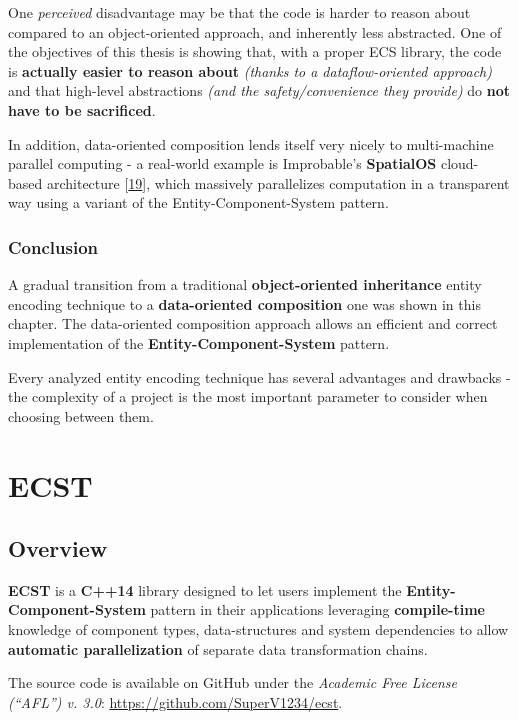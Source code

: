 \documentclass[twoside, 12pt, a4paper, openany]{book}
\begin{document}
One \emph{perceived} disadvantage may be that the code is harder to
reason about compared to an object-oriented approach, and inherently
less abstracted. One of the objectives of this thesis is showing that,
with a proper ECS library, the code is \textbf{actually easier to reason
about} \emph{(thanks to a dataflow-oriented approach)} and that
high-level abstractions \emph{(and the safety/convenience they provide)}
do \textbf{not have to be sacrificed}.

In addition, data-oriented composition lends itself very nicely to
multi-machine parallel computing - a real-world example is Improbable's
\textbf{SpatialOS} cloud-based architecture
{[}\protect\hyperlink{ref-spatialos_learnmore}{19}{]}, which massively
parallelizes computation in a transparent way using a variant of the
Entity-Component-System pattern.

\section{Conclusion}\label{conclusion}

A gradual transition from a traditional \textbf{object-oriented
inheritance} entity encoding technique to a \textbf{data-oriented
composition} one was shown in this chapter. The data-oriented
composition approach allows an efficient and correct implementation of
the \textbf{Entity-Component-System} pattern.

Every analyzed entity encoding technique has several advantages and
drawbacks - the complexity of a project is the most important parameter
to consider when choosing between them.

\part{ECST}

\hypertarget{part2_ecst}{\chapter{Overview}\label{part2_ecst}}

\textbf{ECST} is a \textbf{C++14} library designed to let users
implement the \textbf{Entity-Component-System} pattern in their
applications leveraging \textbf{compile-time} knowledge of component
types, data-structures and system dependencies to allow
\textbf{automatic parallelization} of separate data transformation
chains.

The source code is available on GitHub under the \emph{Academic Free
License (``AFL'') v. 3.0}: \url{https://github.com/SuperV1234/ecst}.
\end{document}
